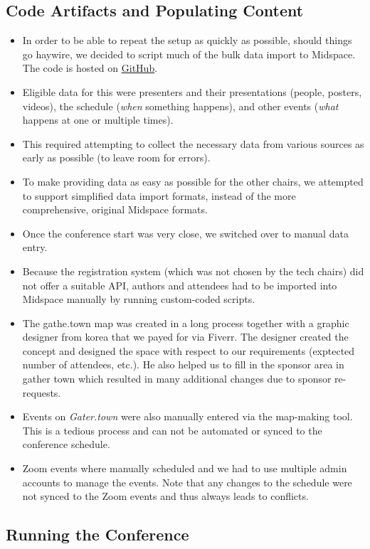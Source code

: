 \documentclass[%
10pt,								%
titlepage,						%
]
{scrartcl}
\begin{document}
\subsection{Code Artifacts and Populating Content}
\begin{itemize}
    \item In order to be able to repeat the setup as quickly as possible, should things go haywire, we decided to script much of the bulk data import to Midspace. The code is hosted on \href{https://github.com/ismir/ismir-2021-utils}{GitHub}.
    \item Eligible data for this were presenters and their presentations (people, posters, videos), the schedule (\emph{when} something happens), and other events (\emph{what} happens at one or multiple times).
    \item This required attempting to collect the necessary data from various sources as early as possible (to leave room for errors).
    \item To make providing data as easy as possible for the other chairs, we attempted to support simplified data import formats, instead of the more comprehensive, original Midspace formats.
    \item Once the conference start was very close, we switched over to manual data entry.
    \item Because the registration system (which was not chosen by the tech chairs) did not offer a suitable API, authors and attendees had to be imported into Midspace manually by running custom-coded scripts.
    \item The gathe.town map was created in a long process together with a graphic designer from korea that we payed for via Fiverr. The designer created the concept and designed the space with respect to our requirements (exptected number of attendees, etc.). He also helped us to fill in the sponsor area in gather town which resulted in many additional changes due to sponsor re-requests.
    \item Events on \emph{Gater.town} were also manually entered via the map-making tool. This is a tedious process and can not be automated or synced to the conference schedule.
    \item Zoom events where manually scheduled and we had to use multiple admin accounts to manage the events. Note that any changes to the schedule were not synced to the Zoom events and thus always leads to conflicts.
\end{itemize}

\subsection{Running the Conference}
\end{document}
